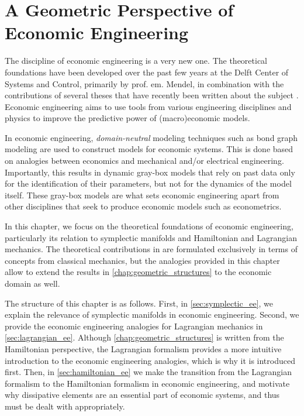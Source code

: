 \chapter{A Geometric Perspective of Economic Engineering}
\label{chap:symplectic_economics}

The discipline of economic engineering is a very new one. The theoretical foundations have been developed over the past few years at the Delft Center of Systems and Control, primarily by prof. em. Mendel,  in combination with the contributions of several theses that have recently been written about the subject \cite{Hutters2020,Kruimer2021,VanArdenne2020,Manders2019}. Economic engineering aims to use tools from various engineering disciplines and physics to improve the predictive power of (macro)economic models.

In economic engineering, \emph{domain-neutral} modeling techniques such as bond graph modeling are used to construct models for economic systems. This is done based on analogies between economics and mechanical and/or electrical engineering. Importantly, this results in dynamic gray-box models that rely on past data only for the identification of their parameters, but not for the dynamics of the model itself. These gray-box models are what sets economic engineering apart from other disciplines that seek to produce economic models such as econometrics.

In this chapter, we focus on the theoretical foundations of economic engineering, particularly its relation to symplectic manifolds and Hamiltonian and Lagrangian mechanics. The theoretical contributions in  are formulated exclusively in terms of concepts from classical mechanics, but the analogies provided in this chapter allow to extend the results in \cref{chap:geometric_structures} to the economic domain as well.

The structure of this chapter is as follows. First, in \cref{sec:symplectic_ee}, we explain the relevance of symplectic manifolds in economic engineering. Second, we provide the economic engineering analogies for Lagrangian mechanics in \cref{sec:lagrangian_ee}. Although \cref{chap:geometric_structures} is written from the Hamiltonian perspective, the Lagrangian formalism provides a more intuitive introduction to the economic engineering analogies, which is why it is introduced first. Then, in \cref{sec:hamiltonian_ee} we make the transition from the Lagrangian formalism to the Hamiltonian formalism in economic engineering, and motivate why dissipative elements are an essential part of economic systems, and thus must be dealt with appropriately.

